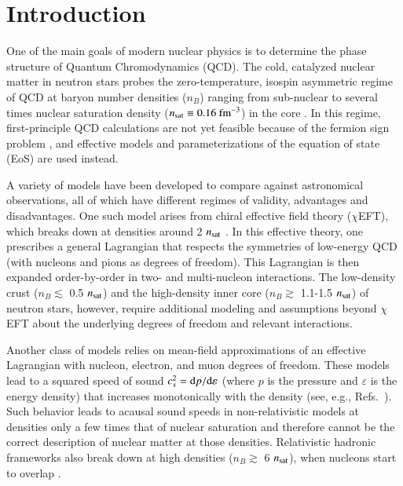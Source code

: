 \documentclass[aps,prd,nofootinbib,tightenlines,notitlepage,floatfix,superscriptaddress,showkeys,twocolumn]{revtex4-1}
\newcommand{\CEFT}{$\chi$EFT }
\begin{document}
\section{Introduction}

One of the main goals of modern nuclear physics is to determine the phase structure of Quantum Chromodynamics (QCD). The cold, catalyzed nuclear matter in neutron stars probes the zero-temperature, isospin asymmetric regime of QCD at baryon number densities ($n_{B}$) ranging from sub-nuclear to several times nuclear saturation density ($n_{\rm sat} \equiv 0.16 \textrm{ fm}^{-3}$) in the core \cite{Baym:2017whm}. In this regime, first-principle QCD calculations are not yet feasible because of the  fermion sign problem \cite{Borsanyi:2021sxv,Borsanyi:2022qlh}, and effective models and parameterizations of the equation of state (EoS) are used instead. 

A variety of models have been developed to compare against astronomical observations, all of which have different regimes of validity, advantages and disadvantages. One such model arises from chiral effective field theory ($\chi$EFT), which breaks down at densities around 2 $n_{\rm sat}$ \cite{Holt:2016pjb,Drischler:2021kxf}. In this effective theory, one prescribes a general Lagrangian that respects the symmetries of low-energy QCD (with nucleons and pions as degrees of freedom). This Lagrangian is then expanded order-by-order in two- and multi-nucleon interactions. The low-density crust ($n_B \lesssim$ 0.5 $n_{\rm sat}$) and the high-density inner core  ($n_B \gtrsim$ 1.1-1.5 $n_{\rm sat}$) \cite{Huth:2021bsp,Raaijmakers:2021uju} of neutron stars, however, require additional modeling and assumptions beyond \CEFT about the underlying degrees of freedom and relevant interactions. 

Another class of models relies on mean-field approximations of an effective Lagrangian with nucleon, electron, and muon degrees of freedom. These models lead to a squared speed of sound $c_s^2 = {\rm d} p/{\rm d} \varepsilon$ (where $p$ is the pressure and $\varepsilon$ is the energy density) that increases monotonically with the density (see, e.g., Refs.~\cite{Douchin:2001sv,Gulminelli:2015csa,Vinas:2021vmv}). Such behavior leads to acausal sound speeds in non-relativistic models at densities only a few times that of nuclear saturation and therefore cannot be the correct description of nuclear matter at those densities. Relativistic hadronic frameworks also break down at high densities ($n_B \gtrsim$ 6 $n_{\rm sat}$), when nucleons start to overlap \cite{Alford:2022bpp}. 
\end{document}
